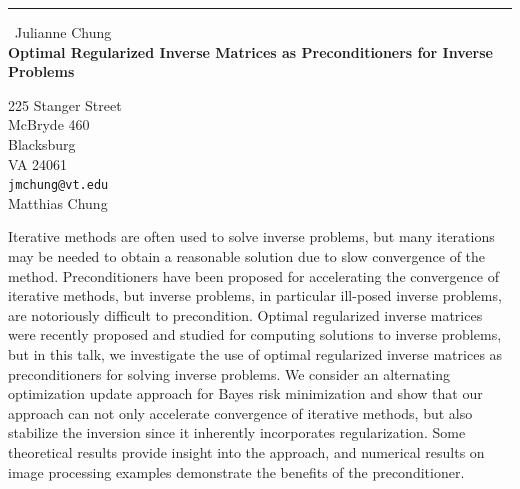 \documentclass{report}
\begin{document}
\begin{center}
\rule{6in}{1pt} \
{\large Julianne Chung \\
{\bf Optimal Regularized Inverse Matrices as Preconditioners for Inverse Problems}}

225 Stanger Street \\ McBryde 460 \\ Blacksburg \\ VA 24061
\\
{\tt jmchung@vt.edu}\\
Matthias Chung\end{center}

Iterative methods are often used to solve inverse problems, but many
iterations may be needed to obtain a reasonable solution due to slow
convergence of the method. Preconditioners have been proposed for
accelerating the convergence of iterative methods, but inverse problems,
in particular ill-posed inverse problems, are notoriously difficult to
precondition. Optimal regularized inverse matrices were recently proposed
and studied for computing solutions to inverse problems, but in this
talk, we investigate the use of optimal regularized inverse matrices as
preconditioners for solving inverse problems. We consider an alternating
optimization update approach for Bayes risk minimization and show that
our approach can not only accelerate convergence of iterative methods,
but also stabilize the inversion since it inherently incorporates
regularization. Some theoretical results provide insight into the
approach, and numerical results on image processing examples demonstrate
the benefits of the preconditioner.
\end{document}
